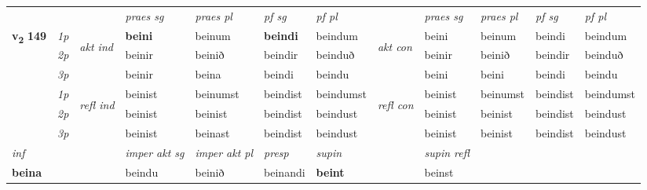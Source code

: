 \begin{longtable}[l]{X>{\footnotesize\itshape}llXXXXlXXXX}
 & &   & \textit{praes sg}  & \textit{praes pl}    & \textit{ pf sg} & \textit{pf pl} & & \textit{praes sg}  & \textit{praes pl}    & \textit{pf sg} & \textit{pf pl }  \\ \cmidrule{4-7} \cmidrule{9-12}
 \multirow{2}{*}{{{\textbf{v{\textsubscript{2}}} \Large{\textbf{149}}}}}  & 1p & \multirow{3}{*}{\begin{turn}{90}\textit{akt ind}\end{turn}} & \textbf{beini} & beinum & \textbf{beindi} & beindum & \multirow{3}{*}{\begin{turn}{90}\textit{akt con}\end{turn}} &beini & beinum & beindi & beindum\\*
 & 2p &  &  beinir  & beinið & beindir & beinduð & & beinir & beinið & beindir & beinduð \\*
 & 3p &  & beinir & beina & beindi & beindu & & beini & beini& beindi & beindu \\*
\cmidrule{4-7} \cmidrule{9-12}
 & 1p & \multirow{3}{*}{\begin{turn}{90}\textit{refl ind}\end{turn}}  & beinist & beinumst & beindist & beindumst & \multirow{3}{*}{\begin{turn}{90}\textit{refl con}\end{turn}}  &beinist & beinumst & beindist & beindumst \\*
 & 2p &  & beinist & beinist & beindist & beindust & &beinist & beinist & beindist & beindust \\*
 & 3p  & & beinist & beinast & beindist & beindust & & beinist & beinist& beindist & beindust \\*
\cmidrule{4-7} \cmidrule{9-12}

   {\textit{inf}} & &  & \textit{imper akt sg} & \textit{imper akt pl}   & \textit{presp} & \textit{supin} && \textit{supin refl}  \\*
  {\textbf{beina}} & && beindu  & beinið   & beinandi &  \textbf{beint} && beinst  \\*

\midrule


\end{longtable}
